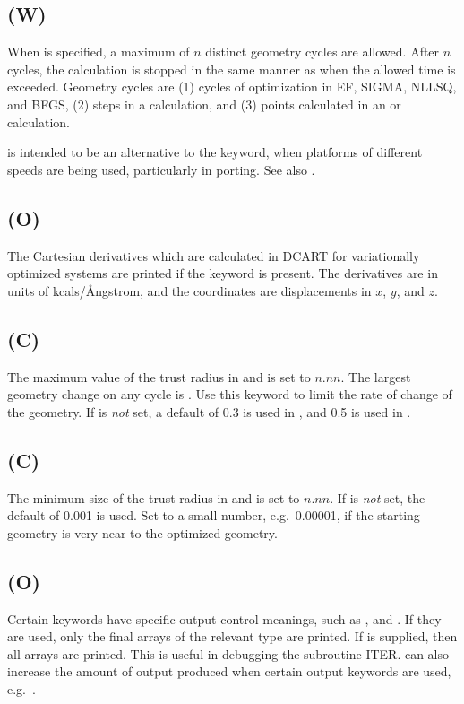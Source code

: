\subsection*{ (W)}
When  is specified, a maximum of $n$ distinct geometry cycles
are allowed.  After $n$ cycles, the calculation is stopped in the same manner
as when the allowed time is exceeded.  Geometry cycles are (1) cycles of
optimization in EF, SIGMA, NLLSQ, and BFGS, (2) steps in a 
calculation, and (3) points calculated in an  or 
calculation.

 is intended to be an alternative to the  keyword,
when platforms of different speeds are being used, particularly in porting. See
also .

\subsection*{ (O)}
The  Cartesian  derivatives  which  are  calculated  in DCART   for
variationally  optimized  systems  are  printed  if  the keyword is present.  The  derivatives  are  in  units  of  kcals/\AA ngstrom,  and
the coordinates are displacements in $x$, $y$, and $z$.

\subsection*{ (C)}
The maximum value of the trust radius in  and  is set to
$n.nn$. The largest geometry change on any cycle is .  Use this
keyword to limit the rate of change of the geometry. If  is {\em
not} set, a default of 0.3 is used in ,  and 0.5 is used in
.

\subsection*{ (C)}
The minimum size of the trust radius in  and  is set to
$n.nn$. If  is {\em not} set, the default of 0.001 is used. Set
 to a small number, e.g.\ 0.00001, if the starting geometry is very
near to the optimized geometry.

\subsection*{ (O)}
Certain keywords have specific  output  control  meanings,  such  as
,    and  .  If they are used, only the
final arrays of the relevant type are printed.  If  is supplied,
then all arrays are printed.   This is useful in debugging the subroutine
ITER.    can also increase the amount of output produced when
certain output  keywords  are  used,  e.g.\ .


